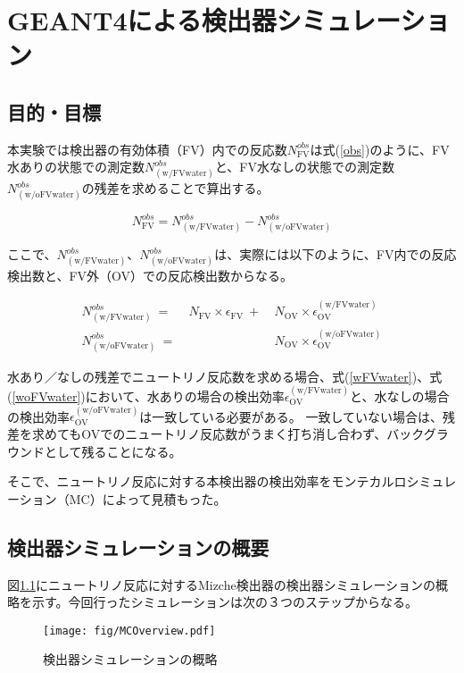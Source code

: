 \documentclass[11pt]{jreport}
\newcommand{\figref}[1]{図\ref{#1}}
\newcommand{\equref}[1]{式(\ref{#1})}
\newcommand{\fv}{\mathrm{FV}}
\newcommand{\ov}{\mathrm{OV}}
\newcommand{\ww}{\mathrm{(w/ FVwater)}}
\newcommand{\wow}{\mathrm{(w/o FVwater)}}
\begin{document}
\chapter{GEANT4による検出器シミュレーション}
\label{MonteCalro}
\section{目的・目標}

本実験では検出器の有効体積（FV）内での反応数$N^{obs}_{\fv}$は\equref{obs}のように、FV水ありの状態での測定数$N^{obs}_{\ww}$と、FV水なしの状態での測定数$N^{obs}_{\wow}$の残差を求めることで算出する。

\begin{equation}
N^{obs}_{\fv} = N^{obs}_{\ww} - N^{obs}_{\wow}
\label{obs}
\end{equation}

ここで、$N^{obs}_{\ww}$、$N^{obs}_{\wow}$は、実際には以下のように、FV内での反応検出数と、FV外（OV）での反応検出数からなる。

\begin{eqnarray}
N^{obs}_{\ww} \ =&\ N_{\fv} \times \epsilon_{\fv} \ +& \ N_{\ov} \times \epsilon^{\ww}_{\ov}
\label{wFVwater}\\
N^{obs}_{\wow} \ =& & \ N_{\ov} \times \epsilon^{\wow}_{\ov}
\label{woFVwater}
\end{eqnarray}


水あり／なしの残差でニュートリノ反応数を求める場合、\equref{wFVwater}、\equref{woFVwater}において、水ありの場合の検出効率$\epsilon^{\ww}_{\ov}$と、水なしの場合の検出効率$\epsilon^{\wow}_{\ov}$は一致している必要がある。
一致していない場合は、残差を求めてもOVでのニュートリノ反応数がうまく打ち消し合わず、バックグラウンドとして残ることになる。

そこで、ニュートリノ反応に対する本検出器の検出効率をモンテカルロシミュレーション（MC）によって見積もった。

\section{検出器シミュレーションの概要}

\figref{MCOverview}にニュートリノ反応に対するMizche検出器の検出器シミュレーションの概略を示す。今回行ったシミュレーションは次の３つのステップからなる。

\begin{figure}[htbp]
\centering
\texttt{[image: fig/MCOverview.pdf]}
\caption[検出器シミュレーションの概略]{検出器シミュレーションの概略}
\label{MCOverview}
\end{figure}
\end{document}
